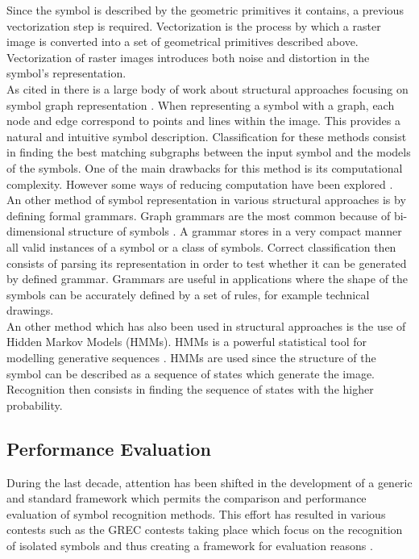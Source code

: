 Since the symbol is described by the geometric primitives it contains, a previous vectorization step is required. Vectorization is the process by which a raster image is converted into a set of geometrical primitives described above. Vectorization of raster images introduces both noise and distortion in the symbol's representation\cite{Llados}. \\

As cited in \cite{Llados} there is a large body of work about structural approaches focusing on symbol graph representation \cite{Groen, hamada, mediangraph,combi,graphmatch,engdrawings,1997combining}. When representing a symbol with a graph, each node and edge correspond to points and lines within the image. This provides a natural and intuitive symbol description. Classification for these methods consist in finding the best matching subgraphs between the input symbol and the models of the symbols. One of the main drawbacks for this method is its computational complexity. However some ways of reducing computation have been explored \cite{Llados}.\\

An other method of symbol representation in various structural approaches is by defining formal grammars. Graph grammars are the most common because of bi-dimensional structure of symbols \cite{Llados}. A grammar stores in a very compact manner all valid instances of a symbol or a class of symbols. Correct classification then consists of parsing its representation in order to test whether it can be generated by defined grammar. Grammars are useful in applications where the shape of the symbols can be accurately defined by a set of rules, for example technical drawings.\\

An other method which has also been used in structural approaches is the use of Hidden Markov Models (HMMs). HMMs is a powerful statistical tool for modelling generative sequences \cite{markovs}. HMMs are used since the structure of the symbol can be described as a sequence of states which generate the image. Recognition then consists in finding the sequence of states with the higher probability.

\subsection{Performance Evaluation}
\label{sec:perf}
During the last decade, attention has been shifted in the development of a generic and standard framework which permits the comparison and performance evaluation of symbol recognition methods. This effort has resulted in various contests such as the GREC contests taking place  which focus on the recognition of isolated symbols and thus creating a framework for evaluation reasons \cite{Delalandre_2012}.

